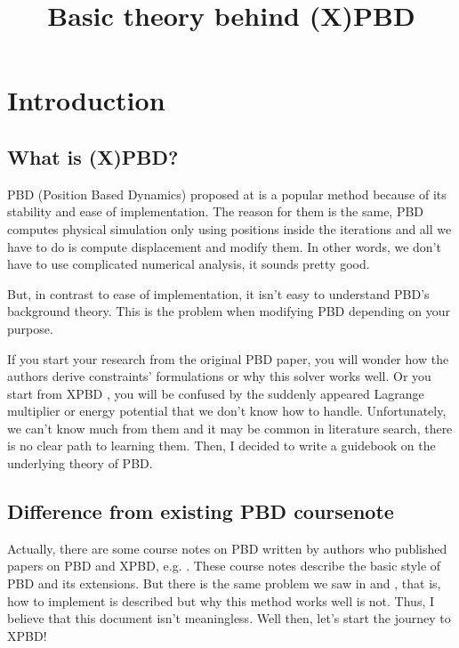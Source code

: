 \documentclass[pdflatex,sn-mathphys-num]{sn-jnl}%
\theoremstyle{thmstyleone}%
\theoremstyle{thmstyletwo}%
\theoremstyle{thmstylethree}%
\begin{document}
	\title[Basic theory behind (X)PBD]{Basic theory behind (X)PBD}
	\author*{ }
\maketitle
\tableofcontents
\newpage

\section{Introduction}\label{sec1}
\subsection{What is (X)PBD?}
PBD (Position Based Dynamics) proposed at \cite{PBD} is a popular method because of its stability and ease of implementation. The reason for them is the same, PBD computes physical simulation only using positions inside the \gls{iteration}s and all we have to do is compute displacement and modify them.
In other words, we don't have to use complicated numerical analysis, it sounds pretty good.

But, in contrast to ease of implementation, it isn't easy to understand PBD's background theory. This is the problem when modifying PBD depending on your purpose. 

If you start your research from the original PBD paper\cite{PBD}, you will wonder how the authors derive constraints' formulations or why this solver works well. Or you start from XPBD \cite{XPBD}, you will be confused by the suddenly appeared Lagrange multiplier or energy potential that we don't know how to handle.
Unfortunately, we can't know much from them and it may be common in literature search, there is no clear path to learning them. Then, I decided to write a guidebook on the underlying theory of PBD.

\subsection{Difference from existing PBD coursenote}
Actually, there are some course notes on PBD written by authors who published papers on PBD and XPBD, e.g. \cite{PBDCoursenote}. These course notes describe the basic style of PBD and its extensions. But there is the same problem we saw in \cite{PBD} and \cite{XPBD}, that is, how to implement is described but why this method works well is not. Thus, I believe that this document isn't meaningless. Well then, let's start the journey to XPBD!
\end{document}
